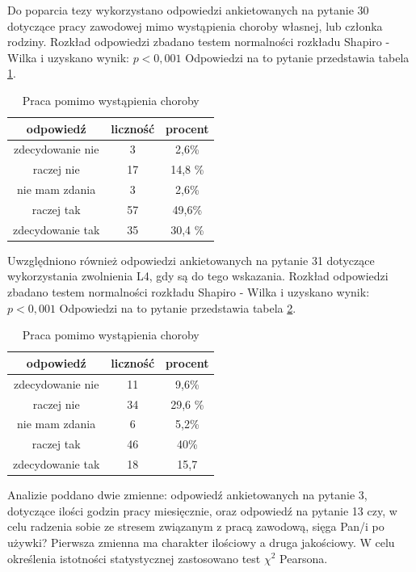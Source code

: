 \documentclass[a4paper,12pt,twoside,openany]{report}
\begin{document}
Do poparcia tezy wykorzystano odpowiedzi ankietowanych na pytanie 30 dotyczące pracy zawodowej   mimo wystąpienia choroby własnej, lub członka rodziny.
Rozkład odpowiedzi zbadano testem normalności rozkładu Shapiro - Wilka
i uzyskano wynik:  $p < 0,001$
Odpowiedzi na to pytanie przedstawia tabela \ref{tab:praca_choroba}.


\begin {table}[h]
\caption{Praca pomimo wystąpienia choroby}
\begin{tabular}{|c|c|c|}
\hline
odpowiedź & liczność & procent\\
\hline
zdecydowanie nie & 3 & 2,6\%\\
\hline
raczej nie & 17 & 14,8 \% \\
\hline
nie mam zdania & 3 & 2,6\%\\
\hline
raczej tak & 57 & 49,6\%\\
\hline
zdecydowanie tak & 35 & 30,4 \%\\
\hline

\end{tabular}
\label{tab:praca_choroba}
\end{table}

Uwzględniono również odpowiedzi ankietowanych na pytanie 31 dotyczące  wykorzystania zwolnienia L4, gdy są do tego wskazania.
Rozkład odpowiedzi zbadano testem normalności rozkładu Shapiro - Wilka
i uzyskano wynik:  $p < 0,001$
Odpowiedzi na to pytanie przedstawia tabela \ref{tab:L4}.

\begin {table}[h]
\caption{Praca pomimo wystąpienia choroby}
\begin{tabular}{|c|c|c|}
\hline
odpowiedź & liczność & procent\\
\hline
zdecydowanie nie & 11 & 9,6\%\\
\hline
raczej nie & 34 & 29,6 \% \\
\hline
nie mam zdania & 6 & 5,2\%\\
\hline
raczej tak & 46 & 40\%\\
\hline
zdecydowanie tak & 18 & 15,7\\
\hline

\end{tabular}
\label{tab:L4}
\end{table}


Analizie poddano dwie zmienne: odpowiedź ankietowanych na pytanie 3, dotyczące ilości godzin pracy miesięcznie, oraz odpowiedź na pytanie 13 czy, w celu radzenia sobie ze stresem związanym z pracą zawodową, sięga Pan/i po używki? Pierwsza zmienna ma charakter ilościowy a druga jakościowy. W celu określenia istotności statystycznej zastosowano test $\chi^2$ Pearsona. 
\end{document}
